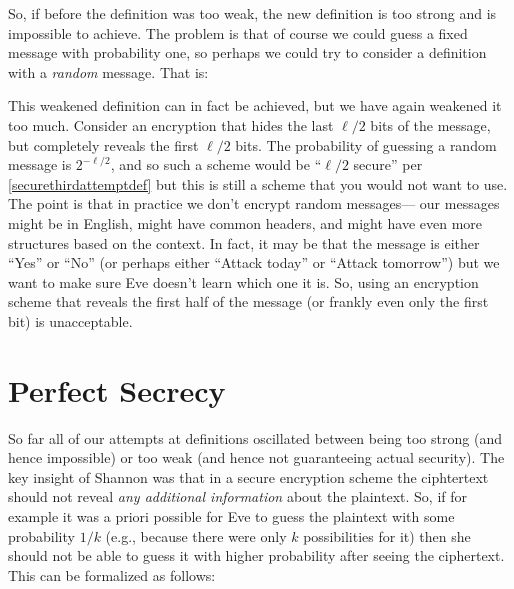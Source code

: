 So, if before the definition was too weak, the new definition is too
strong and is impossible to achieve. The problem is that of course we
could guess a fixed message with probability one, so perhaps we could
try to consider a definition with a \emph{random} message. That is:

\hypertarget{securethirdattemptdef}{}

This weakened definition can in fact be achieved, but we have again
weakened it too much. Consider an encryption that hides the last
\(\ell/2\) bits of the message, but completely reveals the first
\(\ell/2\) bits. The probability of guessing a random message is
\(2^{-\ell/2}\), and so such a scheme would be ``\(\ell/2\) secure'' per
\cref{securethirdattemptdef} but this is still a scheme that you would
not want to use. The point is that in practice we don't encrypt random
messages--- our messages might be in English, might have common headers,
and might have even more structures based on the context. In fact, it
may be that the message is either ``Yes'' or ``No'' (or perhaps either
``Attack today'' or ``Attack tomorrow'') but we want to make sure Eve
doesn't learn which one it is. So, using an encryption scheme that
reveals the first half of the message (or frankly even only the first
bit) is unacceptable.

\section{Perfect Secrecy}\label{1-Perfect-Secrecy}

So far all of our attempts at definitions oscillated between being too
strong (and hence impossible) or too weak (and hence not guaranteeing
actual security). The key insight of Shannon was that in a secure
encryption scheme the ciphtertext should not reveal \emph{any additional
information} about the plaintext. So, if for example it was a priori
possible for Eve to guess the plaintext with some probability \(1/k\)
(e.g., because there were only \(k\) possibilities for it) then she
should not be able to guess it with higher probability after seeing the
ciphertext. This can be formalized as follows:

